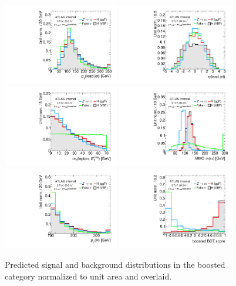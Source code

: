 \begin{figure}[tp]
  \centering
  \includegraphics[width=0.45\textwidth]{figures/overlaid/boost/jet-1-pt}
  \includegraphics[width=0.45\textwidth]{figures/overlaid/boost/jet-1-eta}
  \includegraphics[width=0.45\textwidth]{figures/overlaid/boost/mT}
  \includegraphics[width=0.45\textwidth]{figures/overlaid/boost/mMMC}
  \includegraphics[width=0.45\textwidth]{figures/overlaid/boost/H-pt-hi}
  \includegraphics[width=0.45\textwidth]{figures/overlaid/boost/BDTEve-boost}
  \caption{Predicted signal and background distributions in the boosted category normalized to unit area and overlaid.}
  \label{fig:strategy-overlaid-boost-other}
\end{figure}
